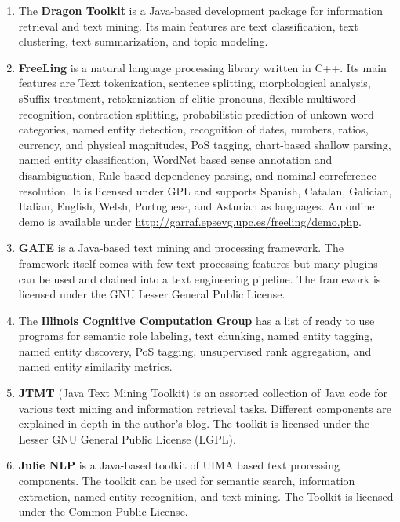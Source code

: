 \begin{enumerate}
	\item The \textbf{Dragon Toolkit} \cite{zhou2007dragon} is a Java-based development package for information retrieval and text mining. Its main features are text classification, text clustering, text summarization, and topic modeling.

	\item \textbf{FreeLing} \cite{atserias2006freeling} is a natural language processing library written in C++. Its main features are Text tokenization, sentence splitting, morphological analysis, sSuffix treatment, retokenization of clitic pronouns, flexible multiword recognition, contraction splitting, probabilistic prediction of unkown word categories, named entity detection, recognition of dates, numbers, ratios, currency, and physical magnitudes, PoS tagging, chart-based shallow parsing, named entity classification,  WordNet based sense annotation and disambiguation, Rule-based dependency parsing, and nominal correference resolution.
It is licensed under GPL and supports Spanish, Catalan, Galician, Italian, English, Welsh, Portuguese, and Asturian as languages. An online demo is available under \url{http://garraf.epsevg.upc.es/freeling/demo.php}.

	\item \textbf{GATE} \cite{cunningham2002gate} is a Java-based text mining and processing framework. The framework itself comes with few text processing features but many plugins can be used and chained into a text engineering pipeline.
The framework is licensed under the GNU Lesser General Public License.

	\item The \textbf{Illinois Cognitive Computation Group} \cite{illinoisccg} has a list of ready to use programs for semantic role labeling, text chunking, named entity tagging, named entity discovery, PoS tagging, unsupervised rank aggregation, and named entity similarity metrics.
	
	\item \textbf{JTMT} (Java Text Mining Toolkit) \cite{JTMT} is an assorted collection of Java code for various text mining and information retrieval tasks. Different components are explained in-depth in the author's blog. The toolkit is licensed under the Lesser GNU General Public License (LGPL).

	\item \textbf{Julie NLP} \cite{tomanek2007uima,hahn2008overview} is a Java-based toolkit of UIMA based text processing components. The toolkit can be used for semantic search, information extraction, named entity recognition, and text mining.
The Toolkit is licensed under the Common Public License.


\end{enumerate}
